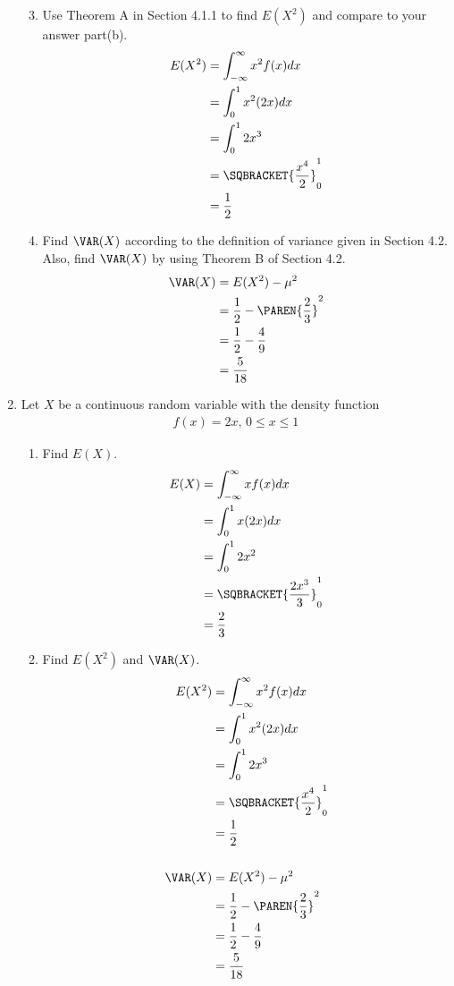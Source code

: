 \documentclass[10pt,a4paper]{report}
\newcommand{\BLUE}[1]{\textcolor{blue}{#1}}
\begin{document}
\begin{enumerate}
\begin{enumerate}
		\setcounter{enumi}{2}
		\item Use Theorem A in Section 4.1.1 to find $E(X^2)$ and compare to your answer part(b).
		\BLUE{\begin{align*}
			E(X^2) &= \int_{-\infty}^\infty  x^2f(x)dx \\
			&=  \int_{0}^1  x^2(2x)dx \\
			&=  \int_{0}^1  2x^3 \\
			&= \SQBRACKET{\frac{x^4}{2}}_{0}^1 \\
			&= \frac{1}{2}
		\end{align*}
		}
		\item Find $\VAR(X)$ according to the definition of variance given in Section 4.2.  Also, find $\VAR(X)$ by using Theorem B of Section 4.2.
		\BLUE{\begin{align*}
			\VAR(X) &= E(X^2) - \mu^2 \\
			&= \frac{1}{2} - \PAREN{\frac{2}{3}}^2 \\
			&= \frac{1}{2} - \frac{4}{9}\\
			&= \frac{5}{18}
		\end{align*}
		}
	\end{enumerate}
	\setcounter{enumi}{13}
	\item Let $X$ be a continuous random variable with the density function
	\begin{align*}
		f(x)=2x, \, 0\le x \le 1
	\end{align*}
	\begin{enumerate}
		\item Find $E(X)$.
		\BLUE{\begin{align*}
			E(X) &= \int_{-\infty}^\infty  xf(x)dx \\
			&=  \int_{0}^1  x(2x)dx \\
			&=  \int_{0}^1  2x^2 \\
			&= \SQBRACKET{\frac{2x^3}{3}}_{0}^1 \\
			&= \frac{2}{3}
		\end{align*} 
		}
		\item Find $E(X^2)$ and $\VAR(X)$.
		\BLUE{\begin{align*}
			E(X^2) &= \int_{-\infty}^\infty  x^2f(x)dx \\
			&=  \int_{0}^1  x^2(2x)dx \\
			&=  \int_{0}^1  2x^3 \\
			&= \SQBRACKET{\frac{x^4}{2}}_{0}^1 \\
			&= \frac{1}{2}\\
			\\
			\VAR(X) &= E(X^2) - \mu^2 \\
			&= \frac{1}{2} - \PAREN{\frac{2}{3}}^2 \\
			&= \frac{1}{2} - \frac{4}{9}\\
			&= \frac{5}{18}
			\end{align*}
		}
	\end{enumerate}
\end{enumerate}
\end{document}
